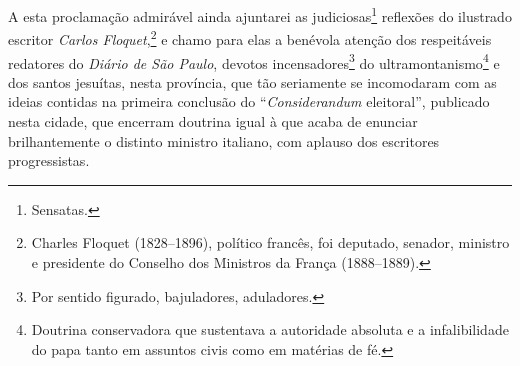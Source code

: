 A esta proclamação admirável ainda ajuntarei as judiciosas\footnote{
  Sensatas.} reflexões do ilustrado escritor \emph{Carlos
Floquet},\footnote{Charles Floquet (1828--1896), político francês, foi
  deputado, senador, ministro e presidente do Conselho dos Ministros da
  França (1888--1889).} e chamo para elas a benévola atenção dos
respeitáveis redatores do \emph{Diário de São Paulo}, devotos
incensadores\footnote{Por sentido figurado, bajuladores, aduladores.}
do ultramontanismo\footnote{Doutrina conservadora que sustentava a\label{ultramontano}
  autoridade absoluta e a infalibilidade do papa tanto em assuntos civis
  como em matérias de fé.} e dos santos jesuítas, nesta província, que
tão seriamente se incomodaram com as ideias contidas na primeira
conclusão do ``\emph{Considerandum} eleitoral'', publicado nesta cidade, que
encerram doutrina igual à que acaba de enunciar brilhantemente o
distinto ministro italiano, com aplauso dos escritores progressistas.

